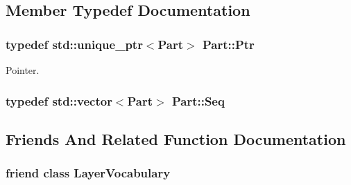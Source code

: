\subsection{Member Typedef Documentation}
\hypertarget{class_part_a270255868bbd294da6cdbe1a22fd71c0}{
\subsubsection[{Ptr}]{\setlength{\rightskip}{0pt plus 5cm}typedef std\-::unique\-\_\-ptr$<${\bf Part}$>$ {\bf Part\-::\-Ptr}\hspace{0.3cm}{\ttfamily [protected]}}}\label{class_part_a270255868bbd294da6cdbe1a22fd71c0}


Pointer. 

\hypertarget{class_part_a9cbb31df0bd4615cb133293acd55a938}{
\subsubsection[{Seq}]{\setlength{\rightskip}{0pt plus 5cm}typedef std\-::vector$<${\bf Part}$>$ {\bf Part\-::\-Seq}\hspace{0.3cm}{\ttfamily [protected]}}}\label{class_part_a9cbb31df0bd4615cb133293acd55a938}


\subsection{Friends And Related Function Documentation}
\hypertarget{class_part_a89d34d14776f6667e8cf4c088578f931}{
\subsubsection[{Layer\-Vocabulary}]{\setlength{\rightskip}{0pt plus 5cm}friend class {\bf Layer\-Vocabulary}\hspace{0.3cm}{\ttfamily [friend]}}}\label{class_part_a89d34d14776f6667e8cf4c088578f931}


